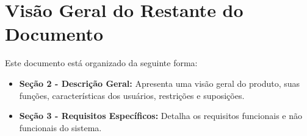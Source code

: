 \section{Visão Geral do Restante do Documento}

Este documento está organizado da seguinte forma:

\begin{itemize}
    \item \textbf{Seção 2 - Descrição Geral:} Apresenta uma visão geral do produto, suas funções, características dos usuários, restrições e suposições.
    \item \textbf{Seção 3 - Requisitos Específicos:} Detalha os requisitos funcionais e não funcionais do sistema.
\end{itemize}
